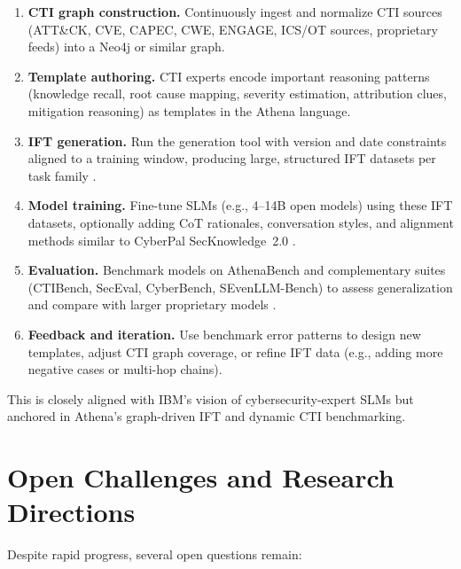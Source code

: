 \documentclass[unnumsec,webpdf,contemporary,large]{oup-authoring-template}
\theoremstyle{thmstyleone}
\theoremstyle{thmstyletwo}
\theoremstyle{thmstylethree}
\begin{document}
\begin{enumerate}
  \item \textbf{CTI graph construction.} Continuously ingest and normalize CTI sources (ATT\&CK, CVE, CAPEC, CWE, ENGAGE, ICS/OT sources, proprietary feeds) into a Neo4j or similar graph.
  \item \textbf{Template authoring.} CTI experts encode important reasoning patterns (knowledge recall, root cause mapping, severity estimation, attribution clues, mitigation reasoning) as templates in the Athena language.
  \item \textbf{IFT generation.} Run the generation tool with version and date constraints aligned to a training window, producing large, structured IFT datasets per task family \cite{cardei2025ift}.
  \item \textbf{Model training.} Fine-tune SLMs (e.g., 4--14B open models) using these IFT datasets, optionally adding CoT rationales, conversation styles, and alignment methods similar to CyberPal SecKnowledge~2.0 \cite{levi2025toward}.
  \item \textbf{Evaluation.} Benchmark models on AthenaBench and complementary suites (CTIBench, SecEval, CyberBench, SEvenLLM-Bench) to assess generalization and compare with larger proprietary models \cite{alam2024ctibench,alam2025athenabench,hu2024seceval,liu2024cyberbench,ji2024sevenllm}.
  \item \textbf{Feedback and iteration.} Use benchmark error patterns to design new templates, adjust CTI graph coverage, or refine IFT data (e.g., adding more negative cases or multi-hop chains).
\end{enumerate}

This is closely aligned with IBM's vision of cybersecurity-expert SLMs but anchored in Athena's graph-driven IFT and dynamic CTI benchmarking.

\section{Open Challenges and Research Directions}

Despite rapid progress, several open questions remain:
\end{document}
